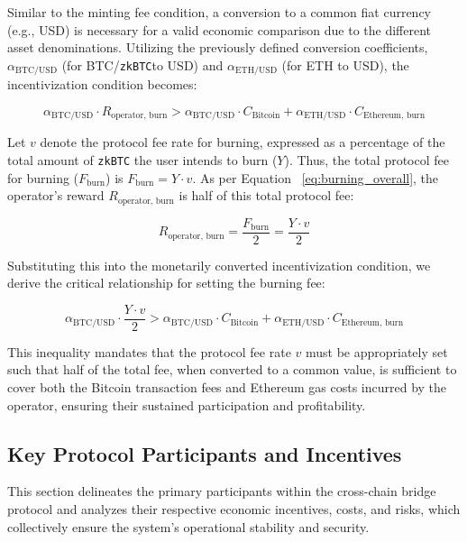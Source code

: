 \documentclass{DESSThesis}
\newcommand{\zktoken}{\texttt{zkBTC}}
\begin{document}
Similar to the minting fee condition, a conversion to a common fiat currency (e.g., USD) is necessary for a valid economic comparison due to the different asset denominations. Utilizing the previously defined conversion coefficients, \(\alpha_{\text{BTC/USD}}\) (for BTC/\zktoken to USD) and \(\alpha_{\text{ETH/USD}}\) (for ETH to USD), the incentivization condition becomes:

\[
\alpha_{\text{BTC/USD}} \cdot R_{\text{operator, burn}} > \alpha_{\text{BTC/USD}} \cdot C_{\text{Bitcoin}} + \alpha_{\text{ETH/USD}} \cdot C_{\text{Ethereum, burn}}
\]

Let \(v\) denote the protocol fee rate for burning, expressed as a percentage of the total amount of \texttt{\zktoken} the user intends to burn (\(Y\)). Thus, the total protocol fee for burning (\(F_{\text{burn}}\)) is \(F_{\text{burn}} = Y \cdot v\). As per Equation ~\ref{eq:burning_overall}, the operator's reward \(R_{\text{operator, burn}}\) is half of this total protocol fee:

\[
R_{\text{operator, burn}} = \frac{F_{\text{burn}}}{2} = \frac{Y \cdot v}{2}
\]

Substituting this into the monetarily converted incentivization condition, we derive the critical relationship for setting the burning fee:

\begin{equation}
\alpha_{\text{BTC/USD}} \cdot \frac{Y \cdot v}{2} > \alpha_{\text{BTC/USD}} \cdot C_{\text{Bitcoin}} + \alpha_{\text{ETH/USD}} \cdot C_{\text{Ethereum, burn}}
\end{equation}

This inequality mandates that the protocol fee rate \(v\) must be appropriately set such that half of the total fee, when converted to a common value, is sufficient to cover both the Bitcoin transaction fees and Ethereum gas costs incurred by the operator, ensuring their sustained participation and profitability.

\subsection{Key Protocol Participants and Incentives}
This section delineates the primary participants within the cross-chain bridge protocol and analyzes their respective economic incentives, costs, and risks, which collectively ensure the system's operational stability and security.
\end{document}
